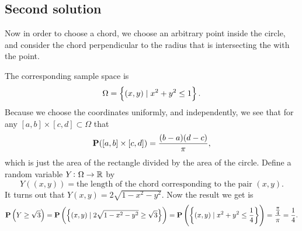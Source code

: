 \documentclass[11pt,a4paper]{article}
\begin{document}
\subsection{Second solution}
Now in order to choose a chord, we choose an arbitrary point inside
the circle, and consider the chord perpendicular to the radius that is
intersecting the with the point.
\begin{center}
\end{center}
The corresponding sample space is
\[
  \Omega = \left\{(x, y) \mid x^2 + y^2 \le 1\right\}.
\]
Because we choose the coordinates uniformly, and independently, 
we see that for any
$[a,b] \times [c,d] \subset \Omega$ that
\[
  \mathbf{P}([a,b] \times [c,d]) = \frac{(b-a)(d-c)}{\pi},
\]
which is just the area of the rectangle divided by the area of the circle.
Define a random variable $Y \colon \Omega \to \mathbb{R}$ by
\[
  Y\left((x, y)\right) = \text{the length of the chord corresponding
  to the pair $(x, y)$}.
\]
It turns out that $Y(x,y) = 2 \sqrt{1 - x^2 - y^2}$.
Now the result we get is
\[
  \mathbf{P}\left(Y \geq \sqrt{3}\right) = 
  \mathbf{P}\left(\left\{(x,y) \mid 2 \sqrt{1 - x^2 - y^2} \geq \sqrt{3}\right\}\right) =
  \mathbf{P}\left(\left\{(x,y) \mid x^2 + y^2 \le \frac{1}{4}\right\}\right) =
  \frac{\frac{\pi}{4}}{\pi} =
  \frac{1}{4}.
\]
\end{document}
